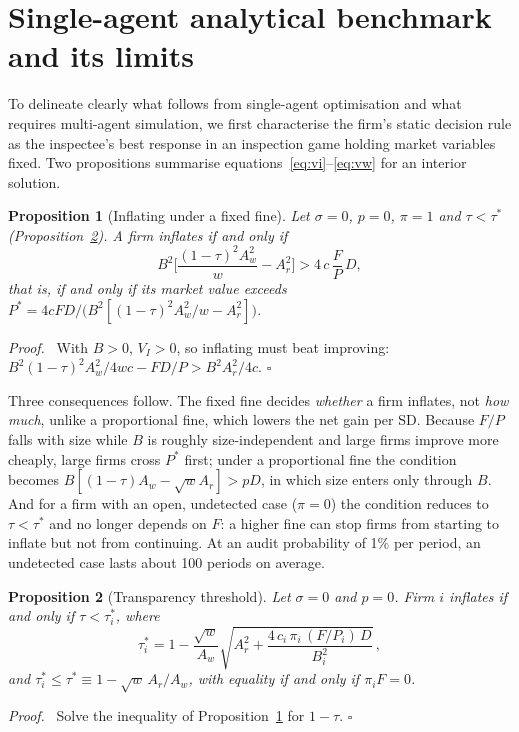 \documentclass[11pt]{article}
\newtheorem{proposition}{Proposition}
\newenvironment{proofsketch}{\par\noindent\textit{Proof.}\ }{\hfill$\square$\par}
\begin{document}
\section{Single-agent analytical benchmark and its limits}\label{sec:benchmark}

To delineate clearly what follows from single-agent optimisation and what requires multi-agent simulation, we first characterise the firm's static decision rule as the inspectee's best response in an inspection game \citep{avenhaus2002inspection} holding market variables fixed. Two propositions summarise equations~\eqref{eq:vi}--\eqref{eq:vw} for an interior solution.

\begin{proposition}[Inflating under a fixed fine]\label{prop:fixed}
Let $\sigma = 0$, $p = 0$, $\pi = 1$ and $\tau < \tau^*$ (Proposition~\ref{prop:threshold}). A firm inflates if and only if
\[
B^2\Big[\frac{(1-\tau)^2 A_w^2}{w} - A_r^2\Big] > 4\, c\, \frac{F}{P}\, D,
\]
that is, if and only if its market value exceeds $P^* = 4cFD \big/ \big(B^2[(1-\tau)^2A_w^2/w - A_r^2]\big)$.
\end{proposition}
\begin{proofsketch}
With $B>0$, $V_I>0$, so inflating must beat improving: $B^2(1-\tau)^2A_w^2/4wc - FD/P > B^2A_r^2/4c$.
\end{proofsketch}

Three consequences follow. The fixed fine decides \emph{whether} a firm inflates, not \emph{how much}, unlike a proportional fine, which lowers the net gain per SD. Because $F/P$ falls with size while $B$ is roughly size-independent and large firms improve more cheaply, large firms cross $P^*$ first; under a proportional fine the condition becomes $B[(1-\tau)A_w - \sqrt{w}A_r] > pD$, in which size enters only through $B$. And for a firm with an open, undetected case ($\pi = 0$) the condition reduces to $\tau < \tau^*$ and no longer depends on $F$: a higher fine can stop firms from starting to inflate but not from continuing. At an audit probability of 1\% per period, an undetected case lasts about 100 periods on average.

\begin{proposition}[Transparency threshold]\label{prop:threshold}
Let $\sigma = 0$ and $p = 0$. Firm $i$ inflates if and only if $\tau < \tau_i^*$, where
\[
\tau_i^* = 1 - \frac{\sqrt{w}}{A_w}\sqrt{A_r^2 + \frac{4\, c_i\, \pi_i\, (F/P_i)\, D}{B_i^2}}\,,
\]
and $\tau_i^* \le \tau^* \equiv 1 - \sqrt{w}\,A_r/A_w$, with equality if and only if $\pi_i F = 0$.
\end{proposition}
\begin{proofsketch}
Solve the inequality of Proposition~\ref{prop:fixed} for $1-\tau$.
\end{proofsketch}
\end{document}
